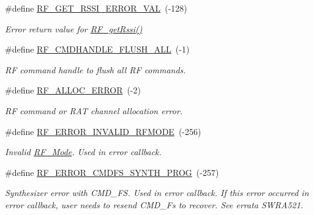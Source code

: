 \begin{DoxyCompactItemize}
\item 
\#define \hyperlink{_r_f_8h_a40e933adc8b5b1c03133451361c5505b}{R\+F\+\_\+\+G\+E\+T\+\_\+\+R\+S\+S\+I\+\_\+\+E\+R\+R\+O\+R\+\_\+\+V\+A\+L}~(-\/128)
\begin{DoxyCompactList}\small\item\em Error return value for \hyperlink{_r_f_8h_ac3fe0d39243fb6bbefe0216d958a6779}{R\+F\+\_\+get\+Rssi()} \end{DoxyCompactList}\item 
\#define \hyperlink{_r_f_8h_aacfd2e3e3a2596605cc8b182df438b2f}{R\+F\+\_\+\+C\+M\+D\+H\+A\+N\+D\+L\+E\+\_\+\+F\+L\+U\+S\+H\+\_\+\+A\+L\+L}~(-\/1)
\begin{DoxyCompactList}\small\item\em R\+F command handle to flush all R\+F commands. \end{DoxyCompactList}\item 
\#define \hyperlink{_r_f_8h_ad2e517d9efabde3a1868a274ed0f683b}{R\+F\+\_\+\+A\+L\+L\+O\+C\+\_\+\+E\+R\+R\+O\+R}~(-\/2)
\begin{DoxyCompactList}\small\item\em R\+F command or R\+A\+T channel allocation error. \end{DoxyCompactList}\item 
\#define \hyperlink{_r_f_8h_a86f899115073dc30d7b528cb0e12a9f1}{R\+F\+\_\+\+E\+R\+R\+O\+R\+\_\+\+I\+N\+V\+A\+L\+I\+D\+\_\+\+R\+F\+M\+O\+D\+E}~(-\/256)
\begin{DoxyCompactList}\small\item\em Invalid \hyperlink{struct_r_f___mode}{R\+F\+\_\+\+Mode}. Used in error callback. \end{DoxyCompactList}\item 
\#define \hyperlink{_r_f_8h_a40a0b1b81a2bebefb91b952d750634dc}{R\+F\+\_\+\+E\+R\+R\+O\+R\+\_\+\+C\+M\+D\+F\+S\+\_\+\+S\+Y\+N\+T\+H\+\_\+\+P\+R\+O\+G}~(-\/257)
\begin{DoxyCompactList}\small\item\em Synthesizer error with C\+M\+D\+\_\+\+F\+S. Used in error callback. If this error occurred in error callback, user needs to resend C\+M\+D\+\_\+\+Fs to recover. See errata S\+W\+R\+A521. \end{DoxyCompactList}\end{DoxyCompactItemize}


